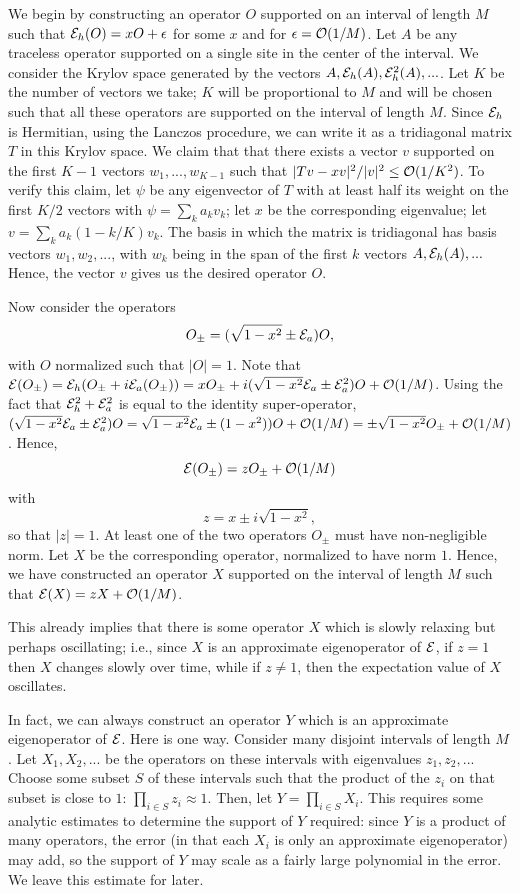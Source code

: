 \documentclass[twocolumn,superscriptaddress, prb]{revtex4-1}
\newcommand{\be}{\begin{equation}}
\newcommand{\ee}{\end{equation}}
\begin{document}
We begin by constructing an operator $O$ supported on an interval of length $M$ such that ${\cal E}_h(O)= x O+\epsilon$ for some $x$ and for $\epsilon={\cal O}(1/M)$.  Let $A$ be any traceless operator supported on a single site in the center of the interval.  We consider the Krylov space generated by the vectors $A, {\cal E}_h(A), {\cal E}_h^2(A),...$.  Let $K$ be the number of vectors we take; $K$ will be proportional to $M$ and will be chosen such that all these operators are supported on the interval of length $M$.
Since ${\cal E}_h$ is Hermitian, using the Lanczos procedure, we can write it as a tridiagonal matrix $T$ in this Krylov space.   We claim that that there exists a vector $v$ supported on the first $K-1$ vectors $w_1,...,w_{K-1}$ such that $|Tv-xv|^2/|v|^2\leq {\cal O}(1/K^2)$.  To verify this claim, let $\psi$ be any eigenvector of $T$ with at least half its weight on the first $K/2$ vectors with $\psi=\sum_k a_k v_k$; let $x$ be the corresponding eigenvalue; let $v=\sum_k a_k (1-k/K) v_k$.
The basis in which the matrix is tridiagonal has basis vectors $w_1,w_2,...$, with $w_k$ being in the span of the first $k$ vectors $A, {\cal E}_h(A),...$
Hence, the vector $v$ gives us the desired operator $O$.

Now consider the operators
\be
O_{\pm}=(\sqrt{1-x^2} \pm {\cal E}_a) O,
\ee
with $O$ normalized such that $|O|=1$.
Note that ${\cal E}(O_{\pm})={\cal E}_h(O_{\pm}+i {\cal E}_a(O_{\pm}))=xO_{\pm}+i(\sqrt{1-x^2}{\cal E}_a \pm {\cal E}_a^2) O + {\cal O}(1/M)$.  Using
the fact that ${\cal E}_h^2+{\cal E}_a^2$ is equal to the identity super-operator, $(\sqrt{1-x^2}{\cal E}_a \pm {\cal E}_a^2) O=\sqrt{1-x^2}{\cal E}_a \pm (1-x^2) ) O +{\cal O}(1/M)=\pm\sqrt{1-x^2}O_{\pm}+{\cal O}(1/M)$.
Hence,
\be
{\cal E}(O_{\pm})=z O_{\pm}+{\cal O}(1/M)
\ee
with
\be
z=x\pm i \sqrt{1-x^2},
\ee
so that $|z|=1$.
At least one of the two operators $O_{\pm}$ must have non-negligible norm.  Let $X$ be the corresponding operator, normalized to have norm $1$.  Hence, we have constructed an operator $X$ supported on the interval of length $M$ such that ${\cal E}(X)=z X + {\cal O}(1/M)$.

This already implies that there is some operator $X$ which is slowly relaxing but perhaps oscillating; i.e., since $X$ is an approximate eigenoperator of ${\cal E}$, if $z=1$ then $X$ changes slowly over time, while if $z \neq 1$, then the expectation value of $X$ oscillates.

In fact, we can always construct an operator $Y$ which is an approximate eigenoperator of ${\cal E}$.  Here is one way.  Consider many disjoint intervals of length $M$.  Let $X_1,X_2,...$ be the operators on these intervals with eigenvalues $z_1,z_2,...$  Choose some subset $S$ of these intervals such that the product of the $z_i$ on that subset is close to $1$: $\prod_{i \in S} z_i \approx 1$.  Then, let $Y=\prod_{i \in S} X_i$.  This requires some analytic estimates to determine the support of $Y$ required: since $Y$ is a product of many operators, the error (in that each $X_i$ is only an approximate eigenoperator) may add, so the support of $Y$ may scale as a fairly large polynomial in the error.  We leave this estimate for later.
\end{document}
